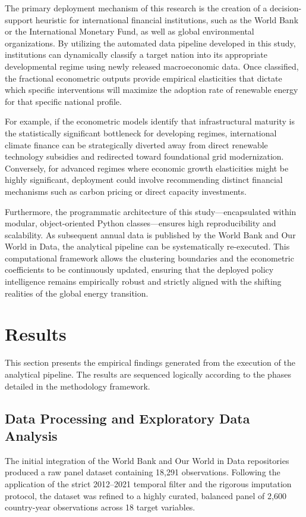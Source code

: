 \documentclass[a4paper,11pt]{article}
\begin{document}
The primary deployment mechanism of this research is the creation of a decision-support heuristic for international financial institutions, such as the World Bank or the International Monetary Fund, as well as global environmental organizations.
By utilizing the automated data pipeline developed in this study, institutions can dynamically classify a target nation into its appropriate developmental regime using newly released macroeconomic data.
Once classified, the fractional econometric outputs provide empirical elasticities that dictate which specific interventions will maximize the adoption rate of renewable energy for that specific national profile.

For example, if the econometric models identify that infrastructural maturity is the statistically significant bottleneck for developing regimes, international climate finance can be strategically diverted away from direct renewable technology subsidies and redirected toward foundational grid modernization.
Conversely, for advanced regimes where economic growth elasticities might be highly significant, deployment could involve recommending distinct financial mechanisms such as carbon pricing or direct capacity investments.

Furthermore, the programmatic architecture of this study—encapsulated within modular, object-oriented Python classes—ensures high reproducibility and scalability.
As subsequent annual data is published by the World Bank and Our World in Data, the analytical pipeline can be systematically re-executed.
This computational framework allows the clustering boundaries and the econometric coefficients to be continuously updated, ensuring that the deployed policy intelligence remains empirically robust and strictly aligned with the shifting realities of the global energy transition.

\section{Results}
This section presents the empirical findings generated from the execution of the analytical pipeline.
The results are sequenced logically according to the phases detailed in the methodology framework.

\subsection{Data Processing and Exploratory Data Analysis}
The initial integration of the World Bank and Our World in Data repositories produced a raw panel dataset containing 18,291 observations.
Following the application of the strict 2012--2021 temporal filter and the rigorous imputation protocol, the dataset was refined to a highly curated, balanced panel of 2,600 country-year observations across 18 target variables. 
\end{document}
